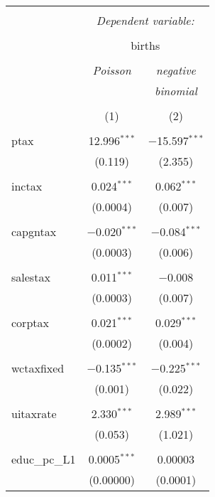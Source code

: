 
\begin{table}[!htbp] \centering 
  \caption{} 
  \label{} 
\begin{tabular}{@{\extracolsep{5pt}}lcc} 
\\[-1.8ex]\hline 
\hline \\[-1.8ex] 
 & \multicolumn{2}{c}{\textit{Dependent variable:}} \\ 
\cline{2-3} 
\\[-1.8ex] & \multicolumn{2}{c}{births} \\ 
\\[-1.8ex] & \textit{Poisson} & \textit{negative} \\ 
 & \textit{} & \textit{binomial} \\ 
\\[-1.8ex] & (1) & (2)\\ 
\hline \\[-1.8ex] 
 ptax & 12.996$^{***}$ & $-$15.597$^{***}$ \\ 
  & (0.119) & (2.355) \\ 
  & & \\ 
 inctax & 0.024$^{***}$ & 0.062$^{***}$ \\ 
  & (0.0004) & (0.007) \\ 
  & & \\ 
 capgntax & $-$0.020$^{***}$ & $-$0.084$^{***}$ \\ 
  & (0.0003) & (0.006) \\ 
  & & \\ 
 salestax & 0.011$^{***}$ & $-$0.008 \\ 
  & (0.0003) & (0.007) \\ 
  & & \\ 
 corptax & 0.021$^{***}$ & 0.029$^{***}$ \\ 
  & (0.0002) & (0.004) \\ 
  & & \\ 
 wctaxfixed & $-$0.135$^{***}$ & $-$0.225$^{***}$ \\ 
  & (0.001) & (0.022) \\ 
  & & \\ 
 uitaxrate & 2.330$^{***}$ & 2.989$^{***}$ \\ 
  & (0.053) & (1.021) \\ 
  & & \\ 
 educ\_pc\_L1 & 0.0005$^{***}$ & 0.00003 \\ 
  & (0.00000) & (0.0001) \\ 

\end{tabular}
\end{table}

